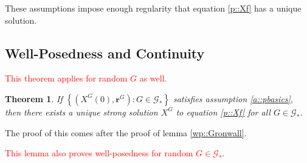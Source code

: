\documentclass[12pt]{article}
\newcommand{\mc}{\mathcal}
\newcommand{\tr}{\textcolor{red}}
\newcommand{\Xf}{X}									%
\newcommand{\rate}{r}								%
\newcommand{\tme}[1]{(#1)}							%
\newcommand{\gind}[1]{^{#1}}						%
\newcommand{\rateset}{\mathbf{\rate}}				%
\newcommand{\Gs}{\mc{G}_\ast}						%
\newtheorem{thms}{Theorem}[section]
\begin{document}
These assumptions impose enough regularity that equation \eqref{p::Xf} has a unique solution.

\subsection{Well-Posedness and Continuity}
\label{awl::wp}

\tr{This theorem applies for random \(G\) as well.}
\begin{thms}
If \(\left\{(\Xf\gind{G}\tme{0},\rateset\gind{G}):G \in \Gs\right\}\) satisfies assumption \ref{a::pbasics}, then there exists a unique strong solution \(\Xf\gind{G}\) to equation \eqref{p::Xf} for all \(G \in \Gs\).
\label{wp::wp}
\end{thms}

The proof of this comes after the proof of lemma \ref{wp::Gronwall}.

\tr{This lemma also proves well-posedness for random \(G\in \Gs\).}
\end{document}
